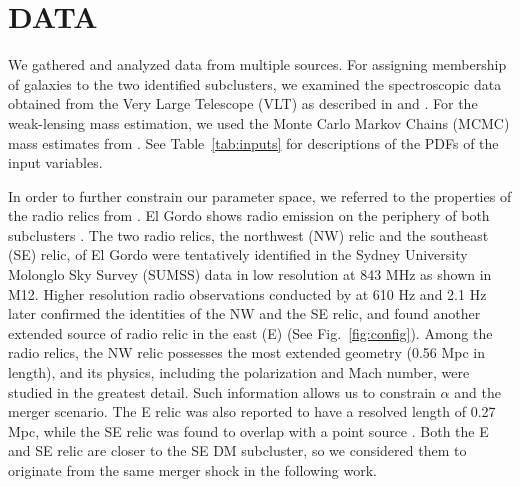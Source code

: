 \documentclass[letterpaper,useAMS,usenatbib]{mn2e}
\begin{document}
\section{DATA} 
We gathered and analyzed data from multiple sources. For assigning membership of galaxies to the two identified subclusters, we
examined the spectroscopic data obtained from the Very Large Telescope
(VLT) as described in  and \citet{Sifon13}.
For the weak-lensing mass estimation, we used the
Monte Carlo Markov Chains (MCMC) mass estimates from .
See Table~\ref{tab:inputs} for descriptions of the PDFs of the input
variables. \par 
In order to further constrain our parameter space, we referred to the properties of
the radio relics from \citet{L13}. El Gordo shows radio emission on the
periphery of both subclusters . The two radio relics, the
northwest (NW) relic and the southeast (SE) relic, of El Gordo were
tentatively identified
in the Sydney University Molonglo Sky Survey (SUMSS) data in low
resolution at 843 MHz \citep{Mauch03} as shown in M12. Higher
resolution radio observations conducted by \cite{L13} at 610 \mega Hz and
2.1 \giga Hz later confirmed the identities of the NW and the SE relic, and
found another extended source of radio relic in the east (E) (See Fig.~\ref{fig:config}). Among the radio relics, the NW relic possesses the most extended geometry
(0.56 Mpc in length), and its physics, including the
polarization and Mach number, were studied in the greatest detail. Such
information allows us to constrain $\alpha$ and the merger scenario. The E relic
was also reported to have a resolved length of 0.27 Mpc, while the SE relic
was found to overlap with a point source \citep{L13}. Both the E and SE
relic are closer to the SE DM subcluster, so we considered them to
originate from the same merger shock in the following work.
\end{document}
